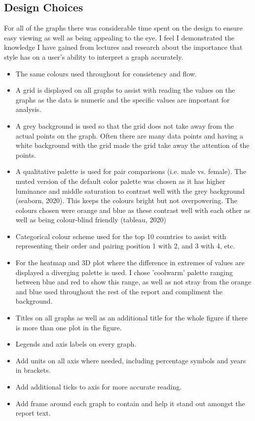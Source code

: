 \documentclass[a4 paper, 12pt]{article}
\begin{document}
        \subsection{Design Choices}
        For all of the graphs there was considerable time spent on the design to ensure easy viewing as well as being appealing to the eye. I feel I demonstrated the knowledge I have gained from lectures and research about the importance that style has on a user's ability to interpret a graph accurately.
            \begin{itemize}
                \item The same colours used throughout for consistency and flow.
                \item A grid is displayed on all graphs to assist with reading the values on the graphs as the data is numeric and the specific values are important for analysis.
                \item A grey background is used so that the grid does not take away from the actual points on the graph. Often there are many data points and having a white background with the grid made the grid take away the attention of the points.
                \item A qualitative palette is used for pair comparisons (i.e. male vs. female). The muted version of the default color palette was chosen as it has higher luminance and middle saturation to contrast well with the grey background (seaborn, 2020). This keeps the colours bright but not overpowering. The colours chosen were orange and blue as these contrast well with each other as well as being colour-blind friendly (tableau, 2020)
                \item Categorical colour scheme used for the top 10 countries to assist with representing their order and pairing position 1 with 2, and 3 with 4, etc.
                \item For the heatmap and 3D plot where the difference in extremes of values are displayed a diverging palette is used. I chose 'coolwarm' palette ranging between blue and red to show this range, as well as not stray from the orange and blue used throughout the rest of the report and compliment the background.
                \item Titles on all graphs as well as an additional title for the whole figure if there is more than one plot in the figure.
                \item Legends and axis labels on every graph.
                \item Add units on all axis where needed, including percentage symbols and years in brackets.
                \item Add additional ticks to axis for more accurate reading.
                \item Add frame around each graph to contain and help it stand out amongst the report text.
            \end{itemize} 
\end{document}
